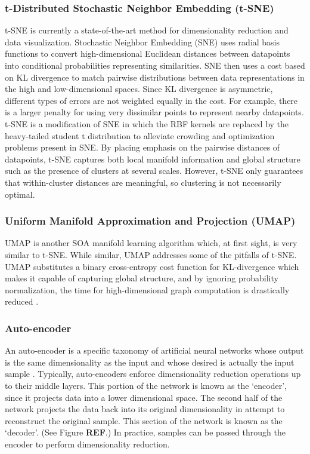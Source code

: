 \documentclass[conference]{IEEEtran}
\begin{document}
	\subsubsection*{t-Distributed Stochastic Neighbor Embedding (t-SNE)} t-SNE is currently a state-of-the-art method for dimensionality reduction and data visualization. Stochastic Neighbor Embedding (SNE) uses radial basis functions  to convert high-dimensional Euclidean distances between datapoints into conditional probabilities representing similarities.  SNE then uses a cost based on KL divergence to match pairwise distributions between data representations in the high and low-dimensional spaces.  Since KL divergence is asymmetric, different types of errors are not weighted equally in the cost.  For example, there is a larger penalty for using very dissimilar points to represent nearby datapoints.  t-SNE is a modification of SNE in which the RBF kernels are replaced by the heavy-tailed student t distribution \cite{vanDerMaaten2008tSNE} to alleviate crowding and optimization problems present in SNE.  By placing emphasis on the pairwise distances of datapoints, t-SNE captures both local manifold information and global structure such as the presence of clusters at several scales. However, t-SNE only guarantees that within-cluster distances are meaningful, so clustering is not necessarily optimal.
	\subsubsection*{Uniform Manifold Approximation and Projection (UMAP)} UMAP is another SOA manifold learning algorithm which, at first sight, is very similar to t-SNE.  While similar, UMAP addresses some of the pitfalls of t-SNE.  UMAP substitutes a binary cross-entropy cost function for KL-divergence which makes it capable of capturing global structure, and by ignoring probability normalization, the time for high-dimensional graph computation is drastically reduced \cite{McInnes2018UMAP}.
	\subsubsection*{Auto-encoder} An auto-encoder is a specific taxonomy of artificial neural networks whose output is the same dimensionality as the input and whose desired is actually the input sample \cite{Haykin2009NeuralNetworks,Goodfellow2016DeepLearning}. Typically, auto-encoders enforce dimensionality reduction operations up to their middle layers.  This portion of the network is known as the `encoder', since it projects data into a lower dimensional space.  The second half of the network projects the data back into its original dimensionality in attempt to reconstruct the original sample.  This section of the network is known as the `decoder'. (See Figure \textbf{REF}.)  In practice, samples can be passed through the encoder to perform dimensionality reduction.
\end{document}
